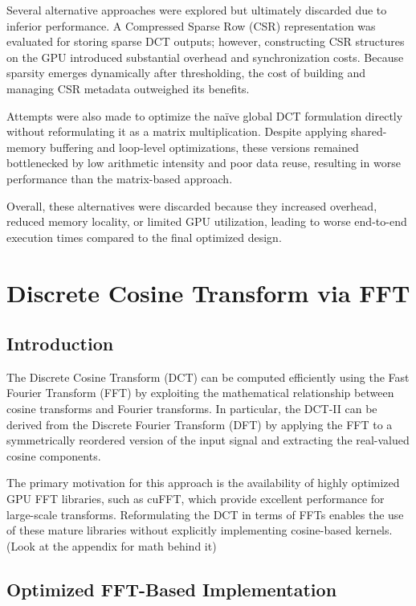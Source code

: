 \documentclass{article}
\begin{document}
\noindent Several alternative approaches were explored but ultimately discarded due to inferior performance. A Compressed Sparse Row (CSR) representation was evaluated for storing sparse DCT outputs; however, constructing CSR structures on the GPU introduced substantial overhead and synchronization costs. Because sparsity emerges dynamically after thresholding, the cost of building and managing CSR metadata outweighed its benefits.

\noindent Attempts were also made to optimize the naïve global DCT formulation directly without reformulating it as a matrix multiplication. Despite applying shared-memory buffering and loop-level optimizations, these versions remained bottlenecked by low arithmetic intensity and poor data reuse, resulting in worse performance than the matrix-based approach.

\noindent Overall, these alternatives were discarded because they increased overhead, reduced memory locality, or limited GPU utilization, leading to worse end-to-end execution times compared to the final optimized design.

\section{Discrete Cosine Transform via FFT}

\subsection{Introduction}

The Discrete Cosine Transform (DCT) can be computed efficiently using the Fast Fourier Transform (FFT) by exploiting the mathematical relationship between cosine transforms and Fourier transforms. In particular, the DCT-II can be derived from the Discrete Fourier Transform (DFT) by applying the FFT to a symmetrically reordered version of the input signal and extracting the real-valued cosine components.

The primary motivation for this approach is the availability of highly optimized GPU FFT libraries, such as cuFFT, which provide excellent performance for large-scale transforms. Reformulating the DCT in terms of FFTs enables the use of these mature libraries without explicitly implementing cosine-based kernels. (Look at the appendix for math behind it)

\subsection{Optimized FFT-Based Implementation}
\end{document}
